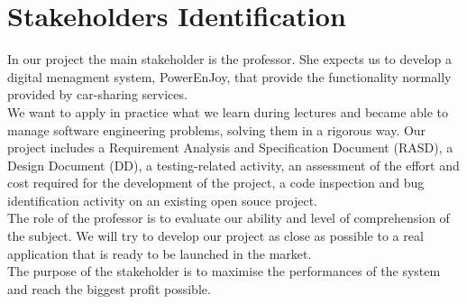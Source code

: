 \section{Stakeholders Identification}
In our project the main stakeholder is the professor. She expects us to develop a digital menagment system, PowerEnJoy, that provide the functionality normally provided by car-sharing services.
\\We want to apply in practice what we learn during lectures and became able to manage software engineering problems, solving them in a rigorous way. Our project includes a Requirement Analysis and Specification Document (RASD), a Design Document (DD), a testing-related activity, an
assessment of the effort and cost required for the development of the project, a code inspection and bug identification activity on an existing open souce project.
\\The role of the professor is to evaluate our ability and level of comprehension of the subject. We will try to develop our project as close as possible to a real application that is ready to be launched in the market.
\\ The purpose of the stakeholder is to maximise the performances of the system and reach the biggest profit possible.
